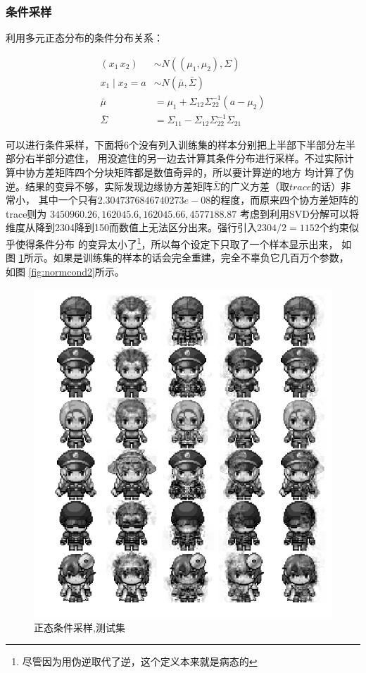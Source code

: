 \documentclass[twocolumn,11pt]{ctexart}
\begin{document}
\subsubsection{条件采样}

利用多元正态分布的条件分布关系：

\begin{align*}
(x_1 \, x_2) &\sim N((\mu_1,\mu_2),\Sigma) \\ 
x_1 \mid x_2 = a &\sim N(\bar{\mu},\bar{\Sigma}) \\
\bar{\mu} &= \mu_1 + \Sigma_{12}\Sigma^{-1}_{22}(a - \mu_2) \\
\bar{\Sigma} &= \Sigma_{11} - \Sigma_{12}\Sigma_{22}^{-1}\Sigma_{21}
\end{align*}

可以进行条件采样，下面将6个没有列入训练集的样本分别把上半部下半部分左半部分右半部分遮住，
用没遮住的另一边去计算其条件分布进行采样。不过实际计算中协方差矩阵四个分块矩阵都是数值奇异的，所以要计算逆的地方
均计算了伪逆。结果的变异不够，实际发现边缘协方差矩阵$\bar{\Sigma}$的广义方差（取$trace$的话）非常小，
其中一个只有$2.3047376846740273e-08$的程度，而原来四个协方差矩阵的trace则为
$3450960.26, 162045.6, 162045.66, 4577188.87$
考虑到利用SVD分解可以将维度从降到2304降到150而数值上无法区分出来。强行引入$2304/2=1152$个约束似乎使得条件分布
的变异太小了\footnote{尽管因为用伪逆取代了逆，这个定义本来就是病态的}，所以每个设定下只取了一个样本显示出来，
如图  \ref{fig:normcond1}所示。如果是训练集的样本的话会完全重建，完全不辜负它几百万个参数，
如图 \ref{fig:normcond2}所示。

\begin{figure}[htb]
  \centering
  \includegraphics[width=0.6\linewidth]{normal_conditional_sample.png}
  \caption{正态条件采样,测试集}
  \label{fig:normcond1}
\end{figure}
\end{document}
